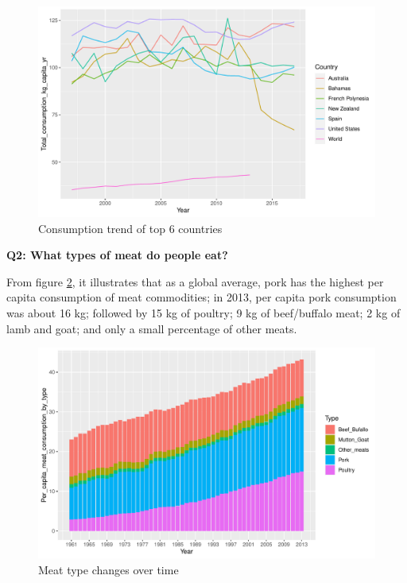 \documentclass[11pt,a4paper,]{article}
\begin{document}
\begin{figure}
\centering
\includegraphics{report_files/figure-latex/highest-consumption-trend-1.pdf}
\caption{\label{fig:highest-consumption-trend}Consumption trend of top 6 countries}
\end{figure}

\clearpage

\textbf{Q2: What types of meat do people eat?}

From figure \ref{fig:Meat-type}, it illustrates that as a global average, pork has the highest per capita consumption of meat commodities; in 2013, per capita pork consumption was about 16 kg; followed by 15 kg of poultry; 9 kg of beef/buffalo meat; 2 kg of lamb and goat; and only a small percentage of other meats.

\begin{figure}
\centering
\includegraphics{report_files/figure-latex/Meat-type-1.pdf}
\caption{\label{fig:Meat-type}Meat type changes over time}
\end{figure}
\end{document}
